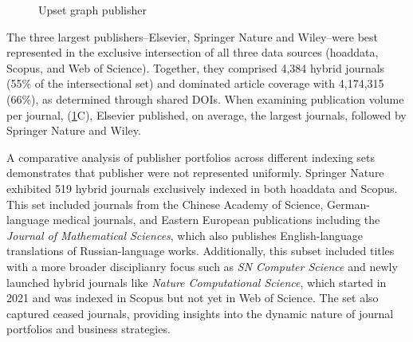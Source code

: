 \documentclass[a4paper,man,floatsintext,longtable,noextraspace,10pt]{apa6}
\begin{document}
\begin{figure}[ht!]


\caption{\label{fig-upset_coverage_results_publisher}Upset graph
publisher}

\end{figure}%

The three largest publishers--Elsevier, Springer Nature and Wiley--were
best represented in the exclusive intersection of all three data sources
(hoaddata, Scopus, and Web of Science). Together, they comprised 4,384
hybrid journals (55\% of the intersectional set) and dominated article
coverage with 4,174,315 (66\%), as determined through shared DOIs. When
examining publication volume per journal,
(\ref{fig-upset_coverage_results_publisher}C), Elsevier published, on
average, the largest journals, followed by Springer Nature and Wiley.

A comparative analysis of publisher portfolios across different indexing
sets demonstrates that publisher were not represented uniformly.
Springer Nature exhibited 519 hybrid journals exclusively indexed in
both hoaddata and Scopus. This set included journals from the Chinese
Academy of Science, German-language medical journals, and Eastern
European publications including the \emph{Journal of Mathematical
Sciences}, which also publishes English-language translations of
Russian-language works. Additionally, this subset included titles with a
more broader disciplianry focus such as \emph{SN Computer Science} and
newly launched hybrid journals like \emph{Nature Computational Science},
which started in 2021 and was indexed in Scopus but not yet in Web of
Science. The set also captured ceased journals, providing insights into
the dynamic nature of journal portfolios and business strategies.
\end{document}
